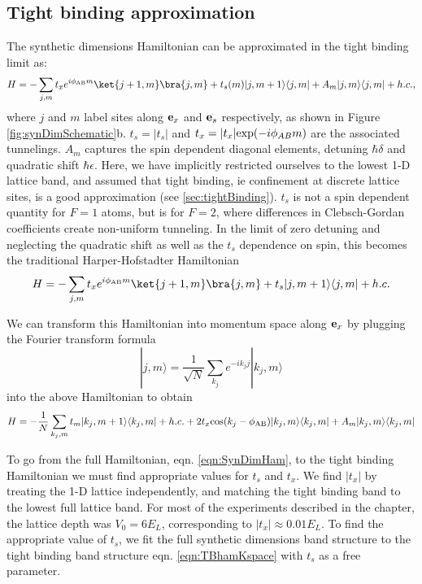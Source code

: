 \subsection{Tight binding approximation}

The synthetic dimensions Hamiltonian can be approximated in the tight binding limit as:
\begin{equation}
H=-\sum_{j,m} t_x e^{i\phi_{\rm AB}m}\ket{j+1,m}\bra{j,m}+t_s(m)|j,m+1\rangle\langle j,m| + A_m|j,m\rangle\langle j,m| + h.c.,
\end{equation}
where $j$ and $m$ label sites along ${\bf e}_x$ and ${\bf e}_s$ respectively, as shown in Figure \ref{fig:synDimSchematic}b. $t_s=|t_s|$ and $t_x=|t_x|{\rm exp}(-i\phi_{AB}m)$ are the associated tunnelings. $A_m$ captures the spin dependent diagonal elements, detuning $\hbar\delta$ and quadratic shift $\hbar\epsilon$. Here, we have implicitly restricted ourselves to the lowest 1-D lattice band, and assumed that tight binding, ie confinement at discrete lattice sites, is a good approximation (see \ref{sec:tightBinding}).  $t_s$ is not a spin dependent quantity for $F=1$ atoms, but is for $F=2$, where differences in Clebsch-Gordan coefficients create non-uniform tunneling. In the limit of zero detuning and neglecting the quadratic shift as well as the $t_s$ dependence on spin, this becomes the traditional Harper-Hofstadter Hamiltonian
\begin{equation}
H=-\sum_{j,m} t_x e^{i\phi_{\rm AB}m}\ket{j+1,m}\bra{j,m}+t_s|j,m+1\rangle\langle j,m| +  h.c.
\end{equation} 

We can transform this Hamiltonian into momentum space along ${\bf e}_x$ by plugging the Fourier transform formula 
\begin{equation}
|j,m\rangle = \frac{1}{\sqrt{N}}\sum_{k_j}e^{-ik_j j}|k_j,m\rangle
\end{equation}
into the above Hamiltonian to obtain 
\begin{equation}
H=-\frac{1}{N}\sum_{k_j,m}t_m|k_j,m+1\rangle\langle k_j,m| + h.c. +2t_x{\rm cos}(k_j-\phi_{\rm AB})|k_j,m\rangle\langle k_j,m| + A_m|k_j,m\rangle\langle k_j,m|
\label{eqn:TBhamKspace}
\end{equation}

To go from the full Hamiltonian, eqn. \ref{eqn:SynDimHam}, to the tight binding Hamiltonian we must find appropriate values for $t_s$ and $t_x$. We find $|t_x|$ by treating the 1-D lattice independently, and matching the tight binding band to the lowest full lattice band. For most of the experiments described in the chapter, the lattice depth was $V_0=6E_L$, corresponding to $|t_x|\approx0.01 E_L$. To find the appropriate value of $t_s$, we fit the full synthetic dimensions band structure to the tight binding band structure eqn. \ref{eqn:TBhamKspace} with $t_s$ as a free parameter. 

